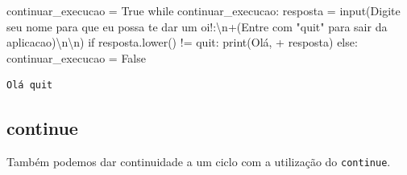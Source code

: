 \documentclass[
  letterpaper,
  DIV=11,
  numbers=noendperiod]{scrreprt}
\newenvironment{Shaded}{\begin{snugshade}}{\end{snugshade}}
\newcommand{\BuiltInTok}[1]{\textcolor[rgb]{0.00,0.23,0.31}{#1}}
\newcommand{\CharTok}[1]{\textcolor[rgb]{0.13,0.47,0.30}{#1}}
\newcommand{\ControlFlowTok}[1]{\textcolor[rgb]{0.00,0.23,0.31}{#1}}
\newcommand{\NormalTok}[1]{\textcolor[rgb]{0.00,0.23,0.31}{#1}}
\newcommand{\OperatorTok}[1]{\textcolor[rgb]{0.37,0.37,0.37}{#1}}
\newcommand{\StringTok}[1]{\textcolor[rgb]{0.13,0.47,0.30}{#1}}
\newcommand{\VariableTok}[1]{\textcolor[rgb]{0.07,0.07,0.07}{#1}}
\begin{document}
\begin{Shaded}
\begin{Highlighting}[]
\NormalTok{continuar\_execucao }\OperatorTok{=} \VariableTok{True}
\ControlFlowTok{while}\NormalTok{ continuar\_execucao:}
\NormalTok{    resposta }\OperatorTok{=} \BuiltInTok{input}\NormalTok{(}\StringTok{\textquotesingle{}Digite seu nome para que eu possa te dar um oi!:}\CharTok{\textbackslash{}n}\StringTok{\textquotesingle{}}\OperatorTok{+}\StringTok{\textquotesingle{}(Entre com "quit" para sair da aplicacao)}\CharTok{\textbackslash{}n\textbackslash{}n}\StringTok{\textquotesingle{}}\NormalTok{)}
    \ControlFlowTok{if}\NormalTok{ resposta.lower() }\OperatorTok{!=} \StringTok{\textquotesingle{}quit\textquotesingle{}}\NormalTok{:}
        \BuiltInTok{print}\NormalTok{(}\StringTok{\textquotesingle{}Olá, \textquotesingle{}} \OperatorTok{+}\NormalTok{ resposta)}
    \ControlFlowTok{else}\NormalTok{:}
\NormalTok{        continuar\_execucao }\OperatorTok{=} \VariableTok{False}
\end{Highlighting}
\end{Shaded}

\begin{tcolorbox}[enhanced jigsaw, breakable, leftrule=.75mm, left=2mm, opacityback=0, bottomrule=.15mm, toprule=.15mm, rightrule=.15mm, arc=.35mm, colback=white]

\begin{verbatim}
Olá quit
\end{verbatim}

\end{tcolorbox}

\hypertarget{continue}{%
\subsection{continue}\label{continue}}

Também podemos dar continuidade a um ciclo com a utilização do
\texttt{continue}.
\end{document}
